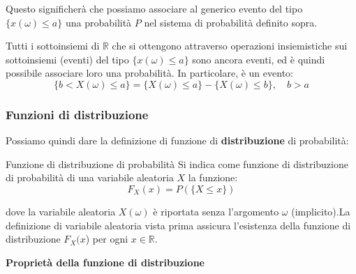 \documentclass[a4paper,11pt]{article}
\begin{document}
Questo significherà che possiamo associare al generico evento del tipo $\{x(\omega) \leq a\}$ una probabilità $P$ nel sistema di probabilità definito sopra.

Tutti i sottoinsiemi di $\mathbb{R}$ che si ottengono attraverso operazioni insiemistiche sui sottoinsiemi (eventi) del tipo $\{x(\omega) \leq a\}$ sono ancora eventi, ed è quindi possibile associare loro una probabilità. In particolare, è un evento:
$$
\{ b < X(\omega) \leq a \} = \{ X(\omega) \leq a \} - \{ X(\omega) \leq b \}, \quad b > a
$$

\subsubsection{Funzioni di distribuzione}
Possiamo quindi dare la definizione di funzione di \textbf{distribuzione} di probabilità:
\begin{definition}{Funzione di distribuzione di probabilità}
Si indica come funzione di distribuzione di probabilità di una variabile aleatoria $X$ la funzione:
$$
F_X(x) = P(\{X \leq x\})
$$
\end{definition}
dove la variabile aleatoria $X(\omega)$ è riportata senza l'argomento $\omega$ (implicito).La definizione di variabile aleatoria vista prima assicura l’esistenza della funzione di distribuzione $F_X(x$) per ogni $x \in \mathbb{R}$.

\par\smallskip

\noindent
\textbf{\textsf{Proprietà della funzione di distribuzione}}
\end{document}

